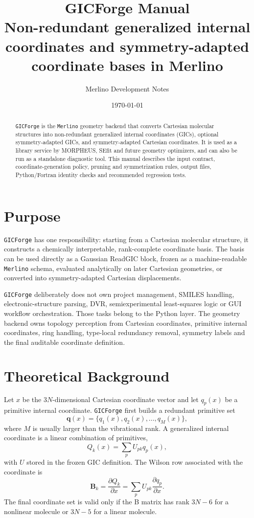 \documentclass[11pt]{article}
\title{\textbf{GICForge Manual}\\
\large Non-redundant generalized internal coordinates and symmetry-adapted coordinate bases in Merlino}
\author{Merlino Development Notes}
\date{\today}
\newcommand{\program}{\texttt{GICForge}}
\newcommand{\merlino}{\texttt{Merlino}}
\begin{document}
\maketitle

\begin{abstract}
\program{} is the \merlino{} geometry backend that converts Cartesian molecular
structures into non-redundant generalized internal coordinates (GICs), optional
symmetry-adapted GICs, and symmetry-adapted Cartesian coordinates.  It is used
as a library service by MORPHEUS, SEfit and future geometry optimizers, and can
also be run as a standalone diagnostic tool.  This manual describes the input
contract, coordinate-generation policy, pruning and symmetrization rules, output
files, Python/Fortran identity checks and recommended regression tests.
\end{abstract}

\tableofcontents
\newpage

\section{Purpose}

\program{} has one responsibility: starting from a Cartesian molecular
structure, it constructs a chemically interpretable, rank-complete coordinate
basis.  The basis can be used directly as a Gaussian ReadGIC block, frozen as a
machine-readable \merlino{} schema, evaluated analytically on later Cartesian
geometries, or converted into symmetry-adapted Cartesian displacements.

\program{} deliberately does not own project management, SMILES handling,
electronic-structure parsing, DVR, semiexperimental least-squares logic or GUI
workflow orchestration.  Those tasks belong to the Python layer.  The geometry
backend owns topology perception from Cartesian coordinates, primitive internal
coordinates, ring handling, type-local redundancy removal, symmetry labels and
the final auditable coordinate definition.

\section{Theoretical Background}

Let \(x\) be the \(3N\)-dimensional Cartesian coordinate vector and let
\(q_p(x)\) be a primitive internal coordinate.  \program{} first builds a
redundant primitive set
\[
  \mathbf{q}(x)=\{q_1(x),q_2(x),\ldots,q_M(x)\},
\]
where \(M\) is usually larger than the vibrational rank.  A generalized
internal coordinate is a linear combination of primitives,
\[
  Q_k(x)=\sum_p U_{pk} q_p(x),
\]
with \(U\) stored in the frozen GIC definition.  The Wilson row associated with
the coordinate is
\[
  \mathbf{B}_k = \frac{\partial Q_k}{\partial x}
              = \sum_p U_{pk}\frac{\partial q_p}{\partial x}.
\]
The final coordinate set is valid only if the B matrix has rank \(3N-6\) for a
nonlinear molecule or \(3N-5\) for a linear molecule.
\end{document}
